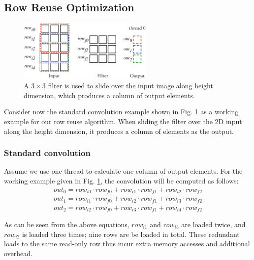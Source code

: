 \subsection{Row Reuse Optimization}
\label{sec:rowreuse}
\begin{figure}[t!]
	\centering
	\includegraphics[width=0.8\columnwidth,height=3cm]{./figure/rowreuse.eps}
	\vspace{-3mm}
\caption{A $3 \times 3$ filter is used to slide over the input image along height dimension, which produces a column of output elements.}
\label{fig:rowreuse}
\end{figure}

 Consider now the standard convolution example shown in Fig. \ref{fig:rowreuse} as a working example for our row
reuse algorithm. When sliding the filter over the 2D input along the height dimension, it produces a column of elements as the output.

\subsubsection{Standard convolution} Assume we use one thread to calculate one column of output elements.
For the working example given in Fig. \ref{fig:rowreuse}, the convolution will be computed as follows:
\begin{gather*}
  out_0=row_{i0} \cdot row_{f0} + row_{i1} \cdot row_{f1} + row_{i2} \cdot row_{f2} \\
out_{1}=row_{i1} \cdot row_{f0} + row_{i2} \cdot row_{f1} + row_{i3} \cdot row_{f2} \\
out_{2}=row_{i2} \cdot row_{f0} + row_{i3} \cdot row_{f1} + row_{i4} \cdot row_{f2}
\end{gather*}

As can be seen from the above equations, $row_{i1}$ and $row_{i3}$ are loaded twice, and $row_{i2}$ is loaded three times; nine rows are be
loaded in total. These redundant loads to the same read-only row thus incur extra memory accesses and additional overhead.

